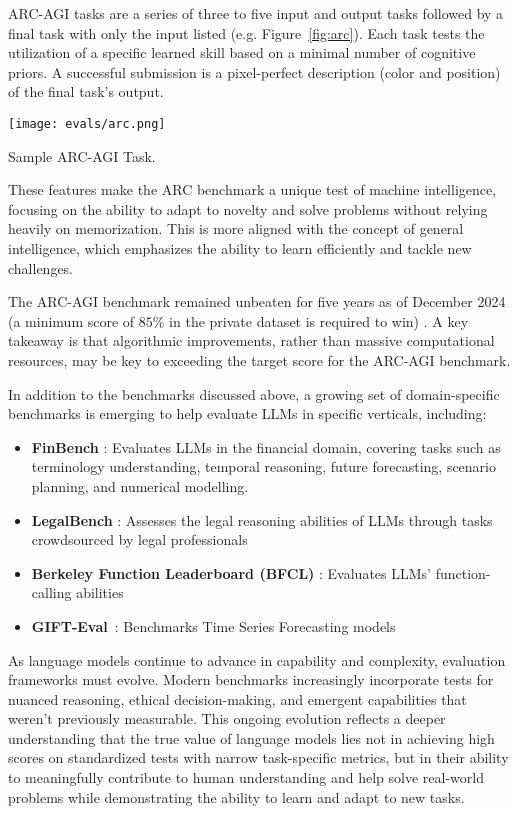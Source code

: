 ARC-AGI tasks are a series of three to five input and output tasks followed by a final task with only the input listed (e.g. Figure~\ref{fig:arc}). Each task tests the utilization of a specific learned skill based on a minimal number of cognitive priors. A successful submission is a pixel-perfect description (color and position) of the final task's output.
\begin{marginfigure}
\centering
\texttt{[image: evals/arc.png]}
\caption[Sample ARC-AGI Task.]{Sample ARC-AGI Task.}
\label{fig:arc}
\end{marginfigure}
These features make the ARC benchmark a unique test of machine intelligence, focusing on the ability to adapt to novelty and solve problems without relying heavily on memorization. This is more aligned with the concept of general intelligence, which emphasizes the ability to learn efficiently and tackle new challenges.

The ARC-AGI benchmark remained unbeaten for five years as of December 2024 (a minimum score of $85\%$ in the private dataset is required to win) . A key takeaway is that algorithmic improvements, rather than massive computational resources, may be key to exceeding the target score for the ARC-AGI benchmark.

In addition to the benchmarks discussed above, a growing set of domain-specific benchmarks is emerging to help evaluate LLMs in specific verticals, including:
\begin{itemize}
    \item \textbf{FinBench} : Evaluates LLMs in the financial domain, covering tasks such as terminology understanding, temporal reasoning, future forecasting, scenario planning, and numerical modelling.
    \item \textbf{LegalBench} : Assesses the legal reasoning abilities of LLMs through tasks crowdsourced by legal professionals
    \item \textbf{Berkeley Function Leaderboard (BFCL)} : Evaluates LLMs' function-calling abilities
    \item \textbf{GIFT-Eval}~: Benchmarks Time Series Forecasting models   
\end{itemize}

As language models continue to advance in capability and complexity, evaluation frameworks must evolve. Modern benchmarks increasingly incorporate tests for nuanced reasoning, ethical decision-making, and emergent capabilities that weren't previously measurable. This ongoing evolution reflects a deeper understanding that the true value of language models lies not in achieving high scores on standardized tests with narrow task-specific metrics, but in their ability to meaningfully contribute to human understanding and help solve real-world problems while demonstrating the ability to learn and adapt to new tasks.

